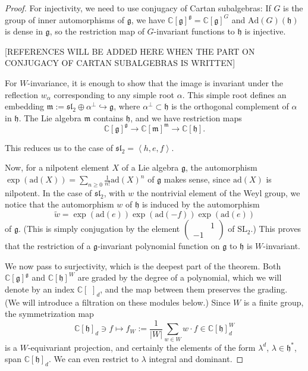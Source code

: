 \begin{proof}
For injectivity, we need to use conjugacy of Cartan subalgebras: If $G$ is the group of inner automorphisms of $\mathfrak g$, we have $\mathbb C[\mathfrak g]^{\mathfrak g}  = \mathbb C[\mathfrak g]^G$ and $\text{Ad}(G)(\mathfrak h)$ is dense in $\mathfrak g$, so the restriction map of $G$-invariant functions to $\mathfrak h$ is injective.

[REFERENCES WILL BE ADDED HERE WHEN THE PART ON CONJUGACY OF CARTAN SUBALGEBRAS IS WRITTEN]

For $W$-invariance, it is enough to show that the image is invariant under the reflection $w_\alpha$ corresponding to any simple root $\alpha$. This simple root defines an embedding $\mathfrak m:=\mathfrak{sl}_2 \oplus \mathfrak \alpha^{\perp}\hookrightarrow \mathfrak g$, where $\alpha^\perp \subset \mathfrak h$ is the orthogonal complement of $\alpha$ in $\mathfrak h$. The Lie algebra $\mathfrak m$ contains $\mathfrak h$, and we have restriction maps 
$$\mathbb C[\mathfrak g]^{\mathfrak g} \to \mathbb C[\mathfrak m]^{\mathfrak m} \to \mathbb C[\mathfrak h].$$

This reduces us to the case of $\mathfrak{sl}_2 = \left< h , e, f\right>$.

Now, for a nilpotent element $X$ of a Lie algebra $\mathfrak g$, the automorphism $\exp(\text{ad}(X)) = \sum_{n\ge 0} \frac{1}{n!} \text{ad}(X)^n$ of $\mathfrak g$ makes sense, since $\text{ad}(X)$ is nilpotent. In the case of $\mathfrak{sl}_2$, with $w$ the nontrivial element of the Weyl group, we notice that the automorphism $w$ of $\mathfrak h$ is induced by the automorphism
$$ \tilde w = \exp(\text{ad}(e)) \exp(\text{ad}(-f)) \exp(\text{ad}(e))$$
of $\mathfrak g$. 
(This is simply conjugation by the element $\begin{pmatrix} & 1 \\ -1 & \end{pmatrix}$ of $\text{SL}_2$.) This proves that the restriction of a $\mathfrak g$-invariant polynomial function on $\mathfrak g$ to $\mathfrak h$ is $W$-invariant.


We now pass to surjectivity, which is the deepest part of the theorem. Both $\mathbb C[\mathfrak g]^{\mathfrak g}$ and $\mathbb C[\mathfrak h]^W$ are graded by the degree of a polynomial, which we will denote by an index $\mathbb C[\,\,]_d$, and the map between them preserves the grading. (We will introduce a filtration on these modules below.) Since $W$ is a finite group, the symmetrization map 
 $$ \mathbb C[\mathfrak h]_d \ni f \mapsto f_W:=\frac{1}{|W|} \sum_{w\in W} w\cdot f \in \mathbb C[\mathfrak h]_d^W$$
 is a $W$-equivariant projection, and certainly the elements of the form $\lambda^d$, $\lambda\in \mathfrak h^*$, span $\mathbb C[\mathfrak h]_d$. We can even restrict to $\lambda$ integral and dominant. 


\end{proof}
